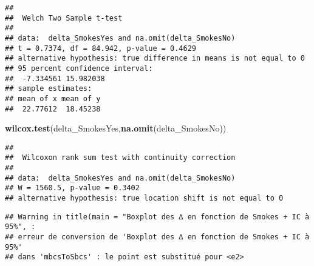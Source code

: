 \documentclass[]{article}
\newenvironment{Shaded}{\begin{snugshade}}{\end{snugshade}}
\newcommand{\KeywordTok}[1]{\textcolor[rgb]{0.13,0.29,0.53}{\textbf{#1}}}
\newcommand{\DataTypeTok}[1]{\textcolor[rgb]{0.13,0.29,0.53}{#1}}
\newcommand{\DecValTok}[1]{\textcolor[rgb]{0.00,0.00,0.81}{#1}}
\newcommand{\StringTok}[1]{\textcolor[rgb]{0.31,0.60,0.02}{#1}}
\newcommand{\CommentTok}[1]{\textcolor[rgb]{0.56,0.35,0.01}{\textit{#1}}}
\newcommand{\OperatorTok}[1]{\textcolor[rgb]{0.81,0.36,0.00}{\textbf{#1}}}
\newcommand{\NormalTok}[1]{#1}
\begin{document}
\begin{verbatim}
## 
##  Welch Two Sample t-test
## 
## data:  delta_SmokesYes and na.omit(delta_SmokesNo)
## t = 0.7374, df = 84.942, p-value = 0.4629
## alternative hypothesis: true difference in means is not equal to 0
## 95 percent confidence interval:
##  -7.334561 15.982038
## sample estimates:
## mean of x mean of y 
##  22.77612  18.45238
\end{verbatim}

\begin{Shaded}
\begin{Highlighting}[]
\KeywordTok{wilcox.test}\NormalTok{(delta_SmokesYes,}\KeywordTok{na.omit}\NormalTok{(delta_SmokesNo))}
\end{Highlighting}
\end{Shaded}

\begin{verbatim}
## 
##  Wilcoxon rank sum test with continuity correction
## 
## data:  delta_SmokesYes and na.omit(delta_SmokesNo)
## W = 1560.5, p-value = 0.3402
## alternative hypothesis: true location shift is not equal to 0
\end{verbatim}

\begin{Shaded}
\end{Shaded}

\begin{verbatim}
## Warning in title(main = "Boxplot des ∆ en fonction de Smokes + IC à 95%", :
## erreur de conversion de 'Boxplot des ∆ en fonction de Smokes + IC à 95%'
## dans 'mbcsToSbcs' : le point est substitué pour <e2>
\end{verbatim}
\end{document}
